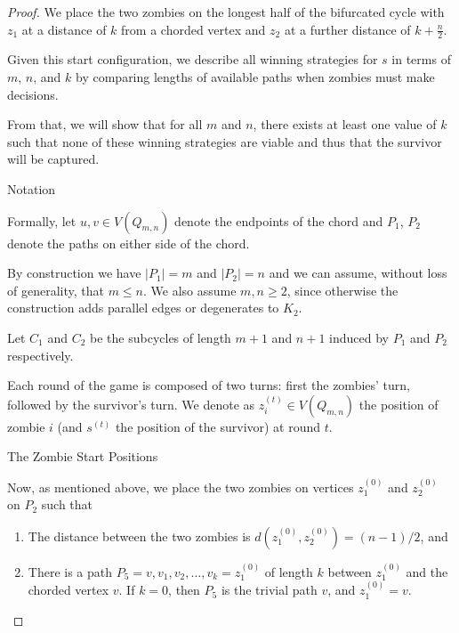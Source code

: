 \documentclass[letterpaper, 10pt]{article}
\begin{document}
\begin{proof}
We place the two zombies on the longest half of the bifurcated cycle with $z_1$ at a distance of $k$
from a chorded vertex and $z_2$ at a further distance of $k + \frac{n}{2}$.

Given this start configuration, we describe all winning strategies for $s$ in terms of
$m$, $n$, and $k$ by comparing lengths of available paths when zombies must make decisions.

From that, we will show that for all $m$ and $n$, there exists at least one value of $k$ such that
none of these winning strategies are viable and thus that the survivor will be captured.

\begin{proofpart} Notation

Formally, let $u,v \in V(Q_{m,n})$ denote the endpoints of the
chord and $P_1$, $P_2$ denote the paths on either side of the chord.

By construction we have $\lvert P_1 \rvert = m$ and $\lvert P_2 \rvert = n$ and we
can assume, without loss of generality, that $m \leq n$. We also assume $m,n \geq 2$, since
otherwise the construction adds parallel edges or degenerates to $K_2$.

Let $C_1$ and $C_2$ be the subcycles of length $m+1$ and $n+1$ induced by
$P_1$ and $P_2$ respectively.

Each round of the game is composed of two turns: first the zombies' turn, followed by the
survivor's turn. We denote as $z_i^{(t)} \in V(Q_{m,n})$ the position of zombie $i$
(and $s^{(t)}$ the position of the survivor) at round $t$.

\end{proofpart}

\begin{proofpart} The Zombie Start Positions

Now, as mentioned above, we place the two zombies on vertices $z_1^{(0)}$ and $z_2^{(0)}$ on $P_2$ such that

\begin{enumerate}
\item The distance between the two zombies is $d(z_1^{(0)}, z_2^{(0)}) = (n-1)/2$,  and
\item There is a path $P_5 = v, v_1, v_2, \dots, v_k = z_1^{(0)}$ of length $k$ between $z_1^{(0)}$ and
    the chorded vertex $v$.
    If $k=0$, then $P_5$ is the trivial path $v$, and $z_1^{(0)} = v$.
\end{enumerate}


\end{proofpart}
\end{proof}
\end{document}
